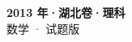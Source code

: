 \documentclass[zihao=-4, a4paper]{ctexart}
\begin{document}
\begin{center}
  {\Large\bfseries 2013 年·湖北卷·理科}\\[4pt]
  {\large 数学 · 试题版}
\end{center}
\medskip
{}

\end{document}
